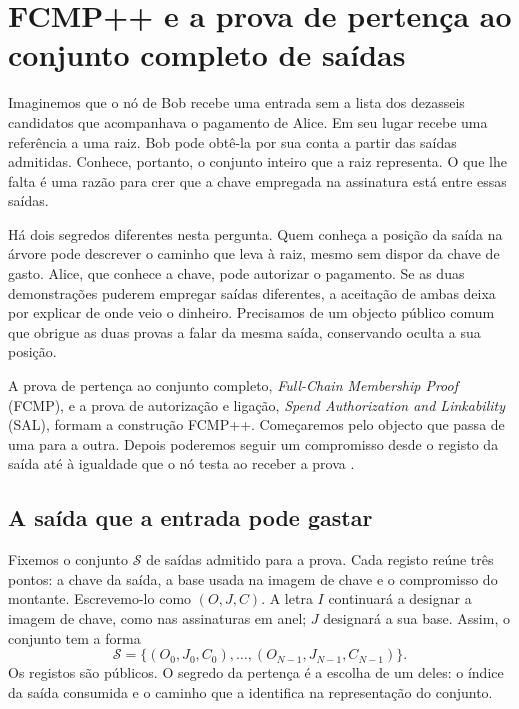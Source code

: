 \chapter{FCMP++ e a prova de pertença ao conjunto completo de saídas}
\label{chapter:fcmp-plus-plus}
\label{page:fcmp-start}
\hypertarget{excerto.fcmp.inicio}{}

Imaginemos que o nó de Bob recebe uma entrada sem a lista dos
dezasseis candidatos que acompanhava o pagamento de Alice. Em seu
lugar recebe uma referência a uma raiz. Bob pode obtê-la por sua
conta a partir das saídas admitidas. Conhece, portanto, o conjunto
inteiro que a raiz representa. O que lhe falta é uma razão para crer
que a chave empregada na assinatura está entre essas saídas.

Há dois segredos diferentes nesta pergunta. Quem conheça a posição
da saída na árvore pode descrever o caminho que leva à raiz, mesmo
sem dispor da chave de gasto. Alice, que conhece a chave, pode
autorizar o pagamento. Se as duas demonstrações puderem empregar
saídas diferentes, a aceitação de ambas deixa por explicar de onde
veio o dinheiro. Precisamos de um objecto público comum que obrigue
as duas provas a falar da mesma saída, conservando oculta a sua posição.

A prova de pertença ao conjunto completo, \emph{Full-Chain Membership
Proof} (FCMP), e a prova de autorização e ligação, \emph{Spend
Authorization and Linkability} (SAL), formam a construção FCMP++.
Começaremos pelo objecto que passa de uma para a outra. Depois
poderemos seguir um compromisso desde o registo da saída até à
igualdade que o nó testa ao receber a prova
\cite{fcmp-plus-plus-paper,fcmp-composition-review}.

\section{A saída que a entrada pode gastar}
\label{sec:fcmp-set-and-choice}
\label{sec:fcmp-input-relation}
\label{sec:fcmp-public-interface}
\label{sec:fcmp-proof-map}

Fixemos o conjunto \(\mathcal S\) de saídas admitido para a prova.
Cada registo reúne três pontos: a chave da saída, a base usada na
imagem de chave e o compromisso do montante. Escrevemo-lo como
\((O,J,C)\). A letra \(I\) continuará a designar a imagem de
chave, como nas assinaturas em anel; \(J\) designará a sua base.
Assim, o conjunto tem a forma
\[
 \mathcal S=\{(O_0,J_0,C_0),\ldots,(O_{N-1},J_{N-1},C_{N-1})\}.
\]
Os registos são públicos. O segredo da pertença é a escolha de um
deles: o índice da saída consumida e o caminho que a identifica na
representação do conjunto.

